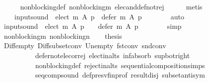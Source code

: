 \begin{isabellebody}
\ \ \ \ \isamarkupfalse%
\ non{\isacharunderscore}{\kern0pt}blocking{\isacharunderscore}{\kern0pt}def\ non{\isacharunderscore}{\kern0pt}blocking{\isacharunderscore}{\kern0pt}m\ elec{\isacharunderscore}{\kern0pt}and{\isacharunderscore}{\kern0pt}def{\isacharunderscore}{\kern0pt}not{\isacharunderscore}{\kern0pt}rej\isanewline
\ \ \ \ \isamarkupfalse%
\ metis\isanewline
\ \ \isamarkupfalse%
\ {}\ \isamarkupfalse%
\isanewline
\ \ \ \ {\isachardoublequoteopen}{\isacharquery}{\kern0pt}input{\isacharunderscore}{\kern0pt}sound\ {\isasymlongrightarrow}\ elect\ m\ A\ p\ {\isasymunion}\ defer\ m\ A\ p\ {\isasymnoteq}\ {\isacharbraceleft}{\kern0pt}{\isacharbraceright}{\kern0pt}{\isachardoublequoteclose}\isanewline
\ \ \ \ \isamarkupfalse%
\ auto\isanewline
\ \ \isamarkupfalse%
\ {\isachardoublequoteopen}{\isacharquery}{\kern0pt}input{\isacharunderscore}{\kern0pt}sound\ {\isasymlongrightarrow}\ {\isacharparenleft}{\kern0pt}elect\ m\ A\ p\ {\isasymnoteq}\ {\isacharbraceleft}{\kern0pt}{\isacharbraceright}{\kern0pt}\ {\isasymor}\ defer\ m\ A\ p\ {\isasymnoteq}\ {\isacharbraceleft}{\kern0pt}{\isacharbraceright}{\kern0pt}{\isacharparenright}{\kern0pt}{\isachardoublequoteclose}\isanewline
\ \ \ \ \isamarkupfalse%
\ simp\isanewline
\ \ \isamarkupfalse%
\ non{\isacharunderscore}{\kern0pt}blocking{\isacharunderscore}{\kern0pt}m\ non{\isacharunderscore}{\kern0pt}blocking{\isacharunderscore}{\kern0pt}n\isanewline
\ \ \isamarkupfalse%
\ {\isacharquery}{\kern0pt}thesis\isanewline
\ \ \ \ \isamarkupfalse%
\ Diff{\isacharunderscore}{\kern0pt}empty\ Diff{\isacharunderscore}{\kern0pt}subset{\isacharunderscore}{\kern0pt}conv\ Un{\isacharunderscore}{\kern0pt}empty\ fst{\isacharunderscore}{\kern0pt}conv\ snd{\isacharunderscore}{\kern0pt}conv\isanewline
\ \ \ \ \ \ \ \ \ \ defer{\isacharunderscore}{\kern0pt}not{\isacharunderscore}{\kern0pt}elec{\isacharunderscore}{\kern0pt}or{\isacharunderscore}{\kern0pt}rej\ elect{\isacharunderscore}{\kern0pt}in{\isacharunderscore}{\kern0pt}alts\ inf{\isachardot}{\kern0pt}absorb{}\ sup{\isacharunderscore}{\kern0pt}bot{\isacharunderscore}{\kern0pt}right\isanewline
\ \ \ \ \ \ \ \ \ \ non{\isacharunderscore}{\kern0pt}blocking{\isacharunderscore}{\kern0pt}def\ reject{\isacharunderscore}{\kern0pt}in{\isacharunderscore}{\kern0pt}alts\ sequential{\isacharunderscore}{\kern0pt}composition{\isachardot}{\kern0pt}simps\isanewline
\ \ \ \ \ \ \ \ \ \ seq{\isacharunderscore}{\kern0pt}comp{\isacharunderscore}{\kern0pt}sound\ def{\isacharunderscore}{\kern0pt}presv{\isacharunderscore}{\kern0pt}fin{\isacharunderscore}{\kern0pt}prof\ result{\isacharunderscore}{\kern0pt}disj\ subset{\isacharunderscore}{\kern0pt}antisym\isanewline

\end{isabellebody}

